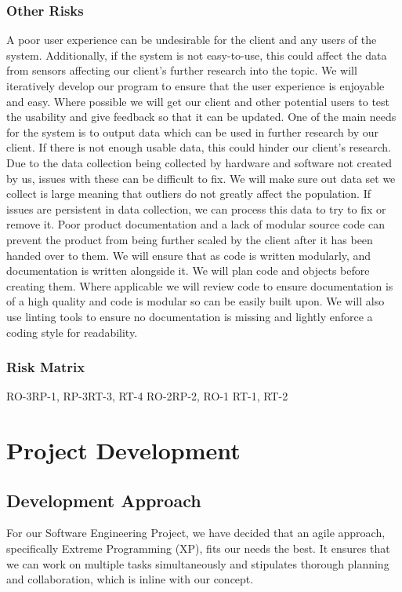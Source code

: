 \documentclass[coverpage,lineno]{../custom}
\begin{document}
\subsubsection{Other Risks}
{A poor user experience can be undesirable for the client and any users of the system. Additionally, if the system is not easy-to-use, this could affect the data from sensors affecting our client’s further research into the topic.}
{We will iteratively develop our program to ensure that the user experience is enjoyable and easy. Where possible we will get our client and other potential users to test the usability and give feedback so that it can be updated.}
{One of the main needs for the system is to output data which can be used in further research by our client. If there is not enough usable data, this could hinder our client’s research.}
{Due to the data collection being collected by hardware and software not created by us, issues with these can be difficult to fix. We will make sure out data set we collect is large meaning that outliers do not greatly affect the population. If issues are persistent in data collection, we can process this data to try to fix or remove it.}
{Poor product documentation and a lack of modular source code can prevent the product from being further scaled by the client after it has been handed over to them.}
{We will ensure that as code is written modularly, and documentation is written alongside it. We will plan code and objects before creating them. Where applicable we will review code to ensure documentation is of a high quality and code is modular so can be easily built upon. We will also use linting tools to ensure no documentation is missing and lightly enforce a coding style for readability.}

\subsubsection{Risk Matrix}

\RiskMatrix
{RO-3}{RP-1, RP-3}{RT-3, RT-4} %
{RO-2}{}{RP-2, RO-1} %
{}{RT-1, RT-2}{} %

\section{Project Development}
\label{sec:dev}

\subsection{Development Approach}
\label{ssec:dev_approach}
For our Software Engineering Project, we have decided that an agile approach, specifically Extreme Programming (XP), fits our needs the best. It ensures that we can work on multiple tasks simultaneously and stipulates thorough planning and collaboration, which is inline with our concept.
\end{document}
